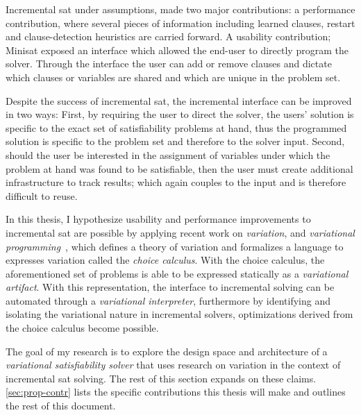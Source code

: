 Incremental \ac{sat} under assumptions, made two major contributions: a
performance contribution, where several pieces of information including learned
clauses, restart and clause-detection heuristics are carried forward. A
usability contribution; Minisat exposed an interface which allowed the end-user
to directly program the solver. Through the interface the user can add or remove
clauses and dictate which clauses or variables are shared and which are unique
in the problem set.

Despite the success of incremental \ac{sat}, the incremental interface can be
improved in two ways: First, by requiring the user to direct the solver, the
users' solution is specific to the exact set of satisfiability problems at hand,
thus the programmed solution is specific to the problem set and therefore to the
solver input. Second, should the user be interested in the assignment of
variables under which the problem at hand was found to be satisfiable, then the
user must create additional infrastructure to track results; which again couples
to the input and is therefore difficult to reuse.

In this thesis, I hypothesize usability and performance improvements to
incremental \ac{sat} are possible by applying recent work on \emph{variation},
and \emph{variational
  programming}~\cite{EW11gttse,EW11tosem,HW16fosd,CEW16ecoop,Walk14onward},
which defines a theory of variation and formalizes a language to expresses
variation called the \emph{choice calculus}. With the choice calculus, the
aforementioned set of problems is able to be expressed statically as a
\emph{variational artifact}. With this representation, the interface to
incremental solving can be automated through a \emph{variational interpreter},
furthermore by identifying and isolating the variational nature in incremental
solvers, optimizations derived from the choice calculus become possible.

The goal of my research is to explore the design space and architecture of a
\emph{variational satisfiability solver} that uses research on variation in the
context of incremental \ac{sat} solving. The rest of this section expands on
these claims. \autoref{sec:prop-contr} lists the specific contributions this
thesis will make and outlines the rest of this document.

